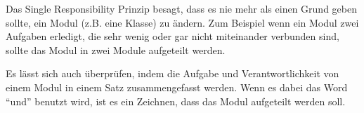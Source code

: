 Das Single Responsibility Prinzip besagt, dass es nie mehr als einen Grund geben sollte,
ein Modul (z.B. eine Klasse) zu ändern. Zum Beispiel wenn ein Modul zwei Aufgaben erledigt, die sehr wenig 
oder gar nicht miteinander verbunden sind, sollte das Modul in zwei Module aufgeteilt werden.

Es lässt sich auch überprüfen, indem die Aufgabe und Verantwortlichkeit von einem Modul 
in einem Satz zusammengefasst werden. Wenn es dabei das Word ``und'' benutzt wird, ist es ein Zeichnen, dass
das Modul aufgeteilt werden soll.



